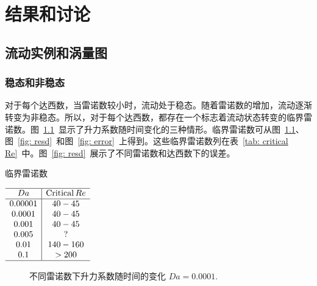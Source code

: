 \chapter{结果和讨论}

\section{流动实例和涡量图}

\subsection{稳态和非稳态}

对于每个达西数，当雷诺数较小时，流动处于稳态。随着雷诺数的增加，流动逐渐转变为非稳态。所以，对于每个达西数，都存在一个标志着流动状态转变的临界雷诺数。图~\ref{fig: Cl_t}~显示了升力系数随时间变化的三种情形。临界雷诺数可从图~\ref{fig: Cl_t}、图~\ref{fig: resd}~和图~\ref{fig: error}~上得到。这些临界雷诺数列在表~\ref{tab: critical Re}~中。图~\ref{fig: resd}~展示了不同雷诺数和达西数下的误差。

\begin{table}[]
	\centering
	\caption{临界雷诺数}\label{tab: critical Re}
	$\begin{array}{c|c}
	\hline
	Da & \mathrm{Critical}\, Re \\ \hline
	0.00001& 40-45   \\
	0.0001 & 40-45 \\
	0.001  & 40-45 \\
	0.005  & ?   \\
	0.01   & 140-160 \\
	0.1    & >200\\
	\hline
	\end{array}$
\end{table}

\begin{figure}[!h]
	\setlength{\subfigcapskip}{-1bp}
	\centering
	\begin{minipage}{\textwidth}
		\centering
	\end{minipage}
	\centering
	\begin{minipage}{\textwidth}
		\centering
	\end{minipage}
	\vspace{0.2em}
	\caption{不同雷诺数下升力系数随时间的变化 $Da=0.0001$.}
	\label{fig: Cl_t}
\end{figure}

